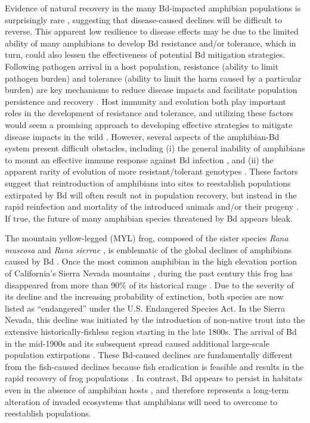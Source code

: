 \documentclass[9pt,twocolumn,twoside,lineno]{pnas-new}
\begin{document}
Evidence of natural recovery in the many Bd-impacted amphibian
populations is surprisingly rare \citep[for notable exceptions,
see][]{scheele2017, voyles2018, knapp2016}, suggesting that
disease-caused declines will be difficult to reverse. This apparent low
resilience to disease effects may be due to the limited ability of many
amphibians to develop Bd resistance and/or tolerance, which in turn,
could also lessen the effectiveness of potential Bd mitigation
strategies. Following pathogen arrival in a host population, resistance
(ability to limit pathogen burden) and tolerance (ability to limit the
harm caused by a particular burden) are key mechanisms to reduce disease
impacts \citep{raberg2009} and facilitate population persistence and
recovery \citep{brannelly2021}. Host immunity and evolution both play
important roles in the development of resistance and tolerance, and
utilizing these factors would seem a promising approach to developing
effective strategies to mitigate disease impacts in the wild
\citep{garner2016, woodhams2011}. However, several aspects of the
amphibian-Bd system present difficult obstacles, including (i) the
general inability of amphibians to mount an effective immune response
against Bd infection \citep{rosenblum2012, fites2013, grogan2018a}, and
(ii) the apparent rarity of evolution of more resistant/tolerant
genotypes \citep[but see][]{savage2016, grogan2018b}. These factors
suggest that reintroduction of amphibians into sites to reestablish
populations extirpated by Bd will often result not in population
recovery, but instead in the rapid reinfection and mortality of the
introduced animals and/or their progeny
\citep{hammond2021, knapp2022, stockwell2008, scheele2021}. If true, the
future of many amphibian species threatened by Bd appears bleak.

The mountain yellow-legged (MYL) frog, composed of the sister species
\emph{Rana muscosa} and \emph{Rana sierrae} \citep{vredenburg2007}, is
emblematic of the global declines of amphibians caused by Bd
\citep{scheele2019}. Once the most common amphibian in the high
elevation portion of California's Sierra Nevada mountains
\citep[USA,][]{grinnell1924}, during the past century this frog has
disappeared from more than 90\% of its historical range
\citep{vredenburg2007}. Due to the severity of its decline and the
increasing probability of extinction, both species are now listed as
``endangered'' under the U.S. Endangered Species Act. In the Sierra
Nevada, this decline was initiated by the introduction of non-native
trout into the extensive historically-fishless region
\citep{bradford1989, knapp2000} starting in the late 1800s. The arrival
of Bd in the mid-1900s and its subsequent spread \citep{vredenburg2019}
caused additional large-scale population extirpations
\citep{vredenburg2010, rachowicz2006}. These Bd-caused declines are
fundamentally different from the fish-caused declines because fish
eradication is feasible \citep{knapp1998} and results in the rapid
recovery of frog populations \citep{knapp2007, vredenburg2004}. In
contrast, Bd appears to persist in habitats even in the absence of
amphibian hosts \citep{walker2007}, and therefore represents a long-term
alteration of invaded ecosystems that amphibians will need to overcome
to reestablish populations.
\end{document}
